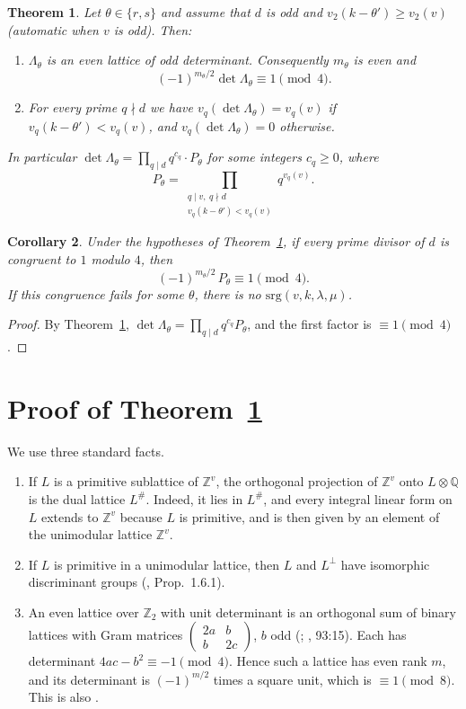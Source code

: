\documentclass[11pt]{amsart}
\newtheorem{theorem}{Theorem}
\newtheorem{corollary}[theorem]{Corollary}
\theoremstyle{remark}
\newcommand{\Z}{\mathbb{Z}}
\newcommand{\Q}{\mathbb{Q}}
\begin{document}
\begin{theorem}\label{thm:main}
Let $\theta\in\{r,s\}$ and assume that $d$ is odd and $v_2(k-\theta')\ge v_2(v)$ (automatic when $v$ is odd). Then:
\begin{enumerate}
\item[(a)] $\Lambda_\theta$ is an even lattice of odd determinant. Consequently $m_\theta$ is even and
\[(-1)^{m_\theta/2}\det\Lambda_\theta\equiv 1\pmod 4 .\]
\item[(b)] For every prime $q\nmid d$ we have $v_q(\det\Lambda_\theta)=v_q(v)$ if $v_q(k-\theta')<v_q(v)$, and
$v_q(\det\Lambda_\theta)=0$ otherwise.
\end{enumerate}
In particular $\det\Lambda_\theta=\prod_{q\mid d}q^{c_q}\cdot P_\theta$ for some integers $c_q\ge0$, where
\[
P_\theta=\prod_{\substack{q\mid v,\ q\nmid d\\ v_q(k-\theta')<v_q(v)}}q^{v_q(v)} .
\]
\end{theorem}

\begin{corollary}\label{cor:mod4}
Under the hypotheses of Theorem~\ref{thm:main}, if every prime divisor of $d$ is congruent to $1$ modulo $4$, then
\[
(-1)^{m_\theta/2}\,P_\theta\equiv 1\pmod 4 .
\]
If this congruence fails for some $\theta$, there is no $\mathrm{srg}(v,k,\lambda,\mu)$.
\end{corollary}

\begin{proof}
By Theorem~\ref{thm:main}, $\det\Lambda_\theta=\prod_{q\mid d}q^{c_q}P_\theta$, and the first factor is $\equiv1\pmod 4$.
\end{proof}

\section{Proof of Theorem~\ref{thm:main}}
We use three standard facts.
\begin{enumerate}
\item[(F1)] If $L$ is a primitive sublattice of $\Z^v$, the orthogonal projection of $\Z^v$ onto $L\otimes\Q$ is
the dual lattice $L^\#$. Indeed, it lies in $L^\#$, and every integral linear form on $L$ extends to $\Z^v$ because
$L$ is primitive, and is then given by an element of the unimodular lattice $\Z^v$.
\item[(F2)] If $L$ is primitive in a unimodular lattice, then $L$ and $L^\perp$ have isomorphic discriminant groups
(\cite{Nik}, Prop.~1.6.1).
\item[(F3)] An even lattice over $\Z_2$ with unit determinant is an orthogonal sum of binary lattices with Gram
matrices $\begin{pmatrix}2a&b\\ b&2c\end{pmatrix}$, $b$ odd (\cite[Ch.~15]{CS}; \cite{OM}, 93:15). Each has
determinant $4ac-b^2\equiv-1\pmod 4$. Hence such a lattice has even rank $m$, and its determinant is
$(-1)^{m/2}$ times a square unit, which is $\equiv1\pmod 8$. This is also \cite[Cor.~6.4]{Mart}.
\end{enumerate}
\end{document}
